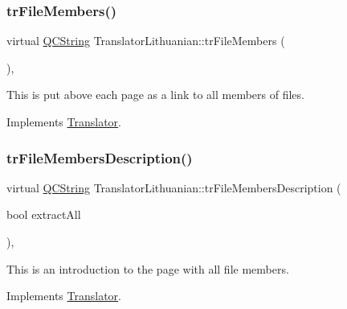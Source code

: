 \mbox{\label{class_translator_lithuanian_a2347a297da78591d85b6d41204bcedb2}} 
\subsubsection{\texorpdfstring{trFileMembers()}{trFileMembers()}}
{\footnotesize\ttfamily virtual \mbox{\hyperlink{class_q_c_string}{Q\+C\+String}} Translator\+Lithuanian\+::tr\+File\+Members (\begin{DoxyParamCaption}{ }\end{DoxyParamCaption})\hspace{0.3cm}{\ttfamily [inline]}, {\ttfamily [virtual]}}

This is put above each page as a link to all members of files. 

Implements \mbox{\hyperlink{class_translator}{Translator}}.

\mbox{\label{class_translator_lithuanian_a6befef96d8b6371d4b8493d51b28d1cf}} 
\subsubsection{\texorpdfstring{trFileMembersDescription()}{trFileMembersDescription()}}
{\footnotesize\ttfamily virtual \mbox{\hyperlink{class_q_c_string}{Q\+C\+String}} Translator\+Lithuanian\+::tr\+File\+Members\+Description (\begin{DoxyParamCaption}\item[{bool}]{extract\+All }\end{DoxyParamCaption})\hspace{0.3cm}{\ttfamily [inline]}, {\ttfamily [virtual]}}

This is an introduction to the page with all file members. 

Implements \mbox{\hyperlink{class_translator}{Translator}}.

\mbox{\label{class_translator_lithuanian_a9fdc4db1941023119000539c8cf675d7}} 
